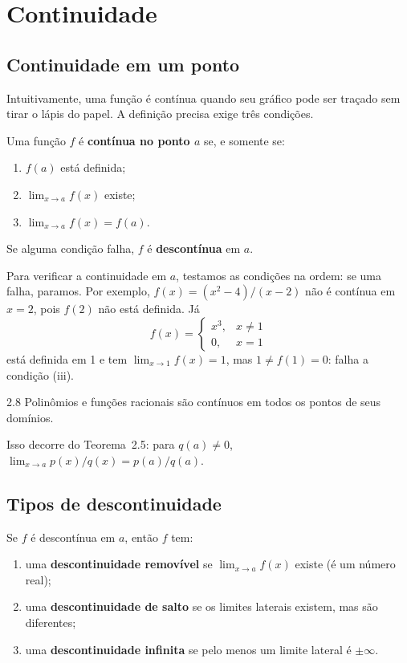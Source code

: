 \section{Continuidade}

\subsection{Continuidade em um ponto}

Intuitivamente, uma função é contínua quando seu gráfico pode ser traçado sem tirar o lápis
do papel. A definição precisa exige três condições.

\begin{definicao}
Uma função $f$ é \textbf{contínua no ponto $a$} se, e somente se:
\begin{enumerate}[label=(\roman*)]
\item $f(a)$ está definida;
\item $\lim_{x\to a}f(x)$ existe;
\item $\lim_{x\to a}f(x)=f(a)$.
\end{enumerate}
Se alguma condição falha, $f$ é \textbf{descontínua} em $a$.
\end{definicao}

Para verificar a continuidade em $a$, testamos as condições na ordem: se uma falha,
paramos. Por exemplo, $f(x)=(x^2-4)/(x-2)$ não é contínua em $x=2$, pois $f(2)$ não está
definida. Já
\[
f(x)=\begin{cases}x^3, & x\neq1\\ 0, & x=1\end{cases}
\]
está definida em 1 e tem $\lim_{x\to1}f(x)=1$, mas $1\neq f(1)=0$: falha a condição (iii).

\begin{teorema}{2.8}
Polinômios e funções racionais são contínuos em todos os pontos de seus domínios.
\end{teorema}
Isso decorre do Teorema~2.5: para $q(a)\neq0$, $\lim_{x\to a}p(x)/q(x)=p(a)/q(a)$.

\subsection{Tipos de descontinuidade}

\begin{definicao}
Se $f$ é descontínua em $a$, então $f$ tem:
\begin{enumerate}[label=\arabic*.]
\item uma \textbf{descontinuidade removível} se $\lim_{x\to a}f(x)$ existe (é um número
  real);
\item uma \textbf{descontinuidade de salto} se os limites laterais existem, mas são
  diferentes;
\item uma \textbf{descontinuidade infinita} se pelo menos um limite lateral é $\pm\infty$.
\end{enumerate}
\end{definicao}

